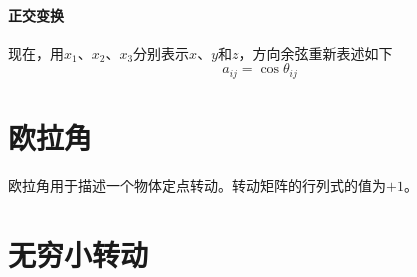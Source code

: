 \paragraph*{正交变换}
现在，用$x_1$、$x_2$、$x_3$分别表示$x$、$y$和$z$，方向余弦重新表述如下
\begin{equation}
	a_{ij} = \cos{\theta_{ij}}
\end{equation}
\section{欧拉角}
欧拉角用于描述一个物体定点转动。转动矩阵的行列式的值为$+1$。

\section{无穷小转动}
